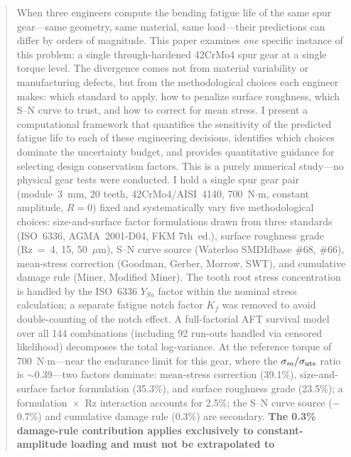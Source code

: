 \documentclass[12pt,a4paper]{article}
\begin{document}
\begin{abstract}
\label{sec:abstract}

When three engineers compute the bending fatigue life of the same spur
gear---same geometry, same material, same load---their predictions can
differ by orders of magnitude. This paper examines \emph{one}
specific instance of this problem: a single through-hardened 42CrMo4
spur gear at a single torque level. The divergence comes not from
material variability or manufacturing defects, but from the
methodological choices each engineer makes: which standard to apply, how
to penalize surface roughness, which S--N curve to trust, and how to
correct for mean stress. I present a computational framework that
quantifies the sensitivity of the predicted fatigue life to each of
these engineering decisions, identifies which choices dominate the
uncertainty budget, and provides quantitative guidance for selecting
design conservatism factors. This is a purely numerical study---no
physical gear tests were conducted. I hold a single spur gear pair
(module~3~mm,%
20 teeth,%
42CrMo4/AISI~4140,%
700~N$\cdot$m,%
constant amplitude, $R=0$) fixed and systematically vary five methodological%
choices: size-and-surface factor formulations drawn from three standards
(ISO~6336, AGMA~2001-D04, FKM 7th~ed.), surface
roughness grade (Rz~=~4, 15, 50~$\mu$m), S--N curve source (Waterloo
SMDIdbase \#68, \#66), mean-stress correction (Goodman, Gerber, Morrow,
SWT), and cumulative damage rule (Miner, Modified Miner). The tooth
root stress concentration is handled by the ISO~6336 $Y_{Sa}$ factor
within the nominal stress calculation; a separate fatigue notch factor
$K_f$ was removed to avoid double-counting of the notch effect. A
full-factorial AFT survival model over all 144 combinations (including
92 run-outs handled via censored likelihood) decomposes the total
log-variance. At the reference torque of 700~N$\cdot$m---near the
endurance limit for this gear, where the $\sigma_m/\sigma_{\rm uts}$
ratio is $\sim$0.39---two factors dominate:
mean-stress correction (39.1\%), size-and-surface factor formulation (35.3\%), and
surface roughness grade (23.5\%); a formulation~$\times$~Rz interaction
accounts for 2.5\%; the S--N curve source ($-$0.7\%) and cumulative
damage rule (0.3\%) are secondary. \textbf{The 0.3\% damage-rule contribution applies exclusively to
constant-amplitude loading and must not be extrapolated to
}
\end{abstract}
\end{document}
